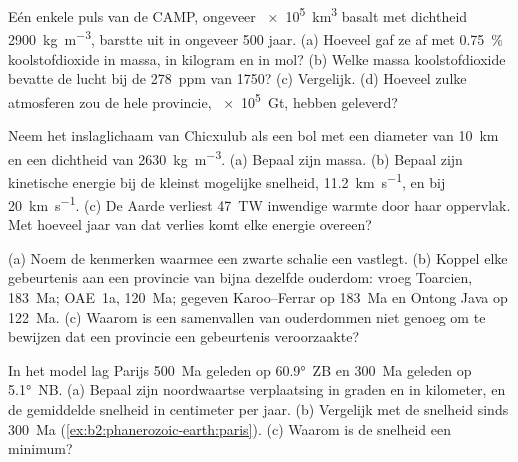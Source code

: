 \begin{exercise}[$\star\star$]\label{exo:b2:phanerozoic-earth:6}
Eén enkele puls van de CAMP, ongeveer \qty{e5}{km^3} basalt met dichtheid \qty{2900}{kg.m^{-3}},
barstte uit in ongeveer 500 jaar. (a) Hoeveel gaf ze af met \qty{0.75}{\percent} koolstofdioxide in massa,
in kilogram en in mol? (b) Welke massa koolstofdioxide bevatte de lucht bij
de \qty{278}{ppm} van 1750? (c) Vergelijk. (d) Hoeveel zulke atmosferen zou de hele provincie,
\qty{e5}{Gt}, hebben geleverd?
\end{exercise}

\begin{exercise}[$\star\star$]\label{exo:b2:phanerozoic-earth:7}
Neem het inslaglichaam van Chicxulub als een bol met een diameter van \qty{10}{km} en een dichtheid van
\qty{2630}{kg.m^{-3}}. (a) Bepaal zijn massa. (b) Bepaal zijn kinetische energie bij de kleinst mogelijke
snelheid, \qty{11.2}{km.s^{-1}}, en bij \qty{20}{km.s^{-1}}. (c) De Aarde verliest \qty{47}{TW}
inwendige warmte door haar oppervlak. Met hoeveel jaar van dat verlies komt elke energie overeen?
\end{exercise}

\begin{exercise}[$\star\star$]\label{exo:b2:phanerozoic-earth:8}
(a) Noem de kenmerken waarmee een zwarte schalie een  vastlegt. (b) Koppel elke
gebeurtenis aan een provincie van bijna dezelfde ouderdom: vroeg Toarcien, \qty{183}{Ma}; OAE~1a,
\qty{120}{Ma}; gegeven Karoo--Ferrar op \qty{183}{Ma} en Ontong Java op \qty{122}{Ma}. (c) Waarom is een
samenvallen van ouderdommen niet genoeg om te bewijzen dat een provincie een gebeurtenis veroorzaakte?
\end{exercise}

\begin{exercise}[$\star\star$]\label{exo:b2:phanerozoic-earth:9}
In het model lag Parijs \qty{500}{Ma} geleden op \ang{60.9}~ZB en \qty{300}{Ma} geleden op \ang{5.1}~NB.
(a) Bepaal zijn noordwaartse verplaatsing in graden en in kilometer, en de gemiddelde snelheid in
centimeter per jaar. (b) Vergelijk met de snelheid sinds \qty{300}{Ma}
(\cref{ex:b2:phanerozoic-earth:paris}). (c) Waarom is de snelheid een minimum?
\end{exercise}

